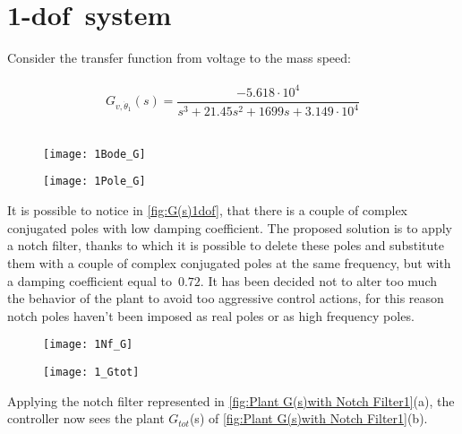 
\section{\acrshort{1-dof}\ system}
Consider the transfer function from voltage to the mass speed:\\
\\
\[	
G_{v, \dot \theta_1}(s)=
\frac{-5.618 \cdot 10^{4}}{{s^3 + 21.45 s^{2}}+1699 s+3.149 \cdot 10^{4}}
\]
\\

\begin{figure*}[h]
	\centering
	\begin{subfigure}{0.55\columnwidth}
		\texttt{[image: 1Bode\_G]}
	\end{subfigure}
	\begin{subfigure}{0.4\columnwidth}
		\texttt{[image: 1Pole\_G]}
	\end{subfigure}
	\caption{$G_{v, \dot \theta_1}(s)$}
	\label{fig:G(s)1dof}
\end{figure*}

It is possible to notice in \cref{fig:G(s)1dof}, that there is a couple of complex conjugated poles with low damping coefficient. The proposed solution is to apply a notch filter, thanks to which it is possible to delete these poles and substitute them with a couple of complex conjugated poles at the same frequency, but with a damping coefficient equal to~$0.72$. It has been decided not to alter too much the behavior of the plant to avoid too aggressive control actions, for this reason notch poles haven't been imposed as real poles or as high frequency poles.

\begin{figure*}[h]
	\centering
	\begin{subfigure}{0.47\columnwidth}
		\texttt{[image: 1Nf\_G]}
	\end{subfigure}
	\begin{subfigure}{0.47\columnwidth}
		\texttt{[image: 1\_Gtot]}
	\end{subfigure}
	\caption{Plant $G(s)$ with Notch Filter $N_f(s)$: $G_{tot}(s)$}
	\label{fig:Plant G(s)with Notch Filter1}
\end{figure*}


Applying the notch filter represented in \cref{fig:Plant G(s)with Notch Filter1}(a), the controller now sees the plant $G_{tot}$(s) of \cref{fig:Plant G(s)with Notch Filter1}(b).

